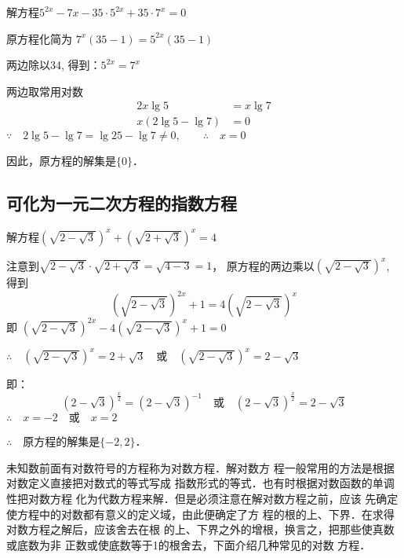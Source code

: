 \begin{example}
  解方程$5^{2x}-7x-35\cdot 5^{2x}+35\cdot 7^x=0$
\end{example}

\begin{solution}
    原方程化简为
  $7^x (35-1)=5^{2x}(35-1)$

  两边除以34, 得到：$5^{2x}=7^x$

  两边取常用对数
  \[\begin{split}
    2x\lg5&=x\lg7\\
  x(2\lg5-\lg7)&=0
  \end{split} \]
$\because\quad   2\lg5-\lg7=\lg25-\lg7\ne 0,\qquad \therefore\quad x=0$

  因此，原方程的解集是$\{0\}$．
\end{solution}

\subsection{可化为一元二次方程的指数方程}

\begin{example}
    解方程$\left(\sqrt{2-\sqrt{3}}\right)^x+\left(\sqrt{2+\sqrt{3}}\right)^x=4$
\end{example}

\begin{solution}
    注意到$\sqrt{2-\sqrt{3}}\cdot \sqrt{2+\sqrt{3}}=\sqrt{4-3}=1$，
原方程的两边乘以$\left(\sqrt{2-\sqrt{3}}\right)^x$, 得到
\[\left(\sqrt{2-\sqrt{3}}\right)^{2x}+1=4\left(\sqrt{2-\sqrt{3}}\right)^x\]
即
$\left(\sqrt{2-\sqrt{3}}\right)^{2x}-4\left(\sqrt{2-\sqrt{3}}\right)^x+1=0$

$\therefore\quad \left(\sqrt{2-\sqrt{3}}\right)^x=2+\sqrt{3}\quad \text{或}\quad \left(\sqrt{2-\sqrt{3}}\right)^x=2-\sqrt{3}$

即：
\[\left({2-\sqrt{3}}\right)^{\tfrac{x}{2}}=\left({2-\sqrt{3}}\right)^{-1}\quad \text{或}\quad \left({2-\sqrt{3}}\right)^{\tfrac{x}{2}}=2-\sqrt{3}\]
$\therefore\quad x=-2\quad \text{或}\quad x=2$

$\therefore\quad $原方程的解集是$\{-2,2\}$．
\end{solution}

未知数前面有对数符号的方程称为对数方程．解对数方
程一般常用的方法是根据对数定义直接把对数式的等式写成
指数形式的等式．也有时根据对数函数的单调性把对数方程
化为代数方程来解．但是必须注意在解对数方程之前，应该
先确定使方程中的对数都有意义的定义域，由此便确定了方
程的根的上、下界．在求得对数方程之解后，应该舍去在根
的上、下界之外的增根，换言之，把那些使真数或底数为非
正数或使底数等于1的根舍去，下面介绍几种常见的对数
方程．

